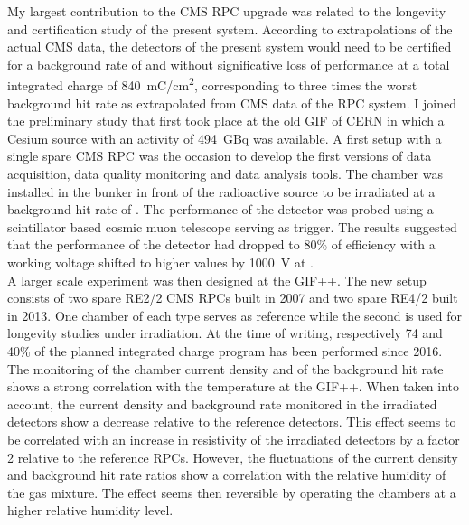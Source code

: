 	My largest contribution to the CMS RPC upgrade was related to the longevity and certification study of the present system. According to extrapolations of the actual CMS data, the detectors of the present system would need to be certified for a background rate of  and without significative loss of performance at a total integrated charge of \SI{840}{mC/cm^2}, corresponding to three times the worst background hit rate as extrapolated from CMS data of the RPC system. I joined the preliminary study that first took place at the old \acl{GIF} of CERN in which a Cesium source with an activity of \SI{494}{GBq} was available. A first setup with a single spare CMS RPC was the occasion to develop the first versions of data acquisition, data quality monitoring and data analysis tools. The chamber was installed in the bunker in front of the radioactive source to be irradiated at a background hit rate of . The performance of the detector was probed using a scintillator based cosmic muon telescope serving as trigger. The results suggested that the performance of the detector had dropped to 80\% of efficiency with a working voltage shifted to higher values by \SI{1000}{V} at .\\
	A larger scale experiment was then designed at the GIF++. The new setup consists of two spare RE2/2 CMS RPCs built in 2007 and two spare RE4/2 built in 2013. One chamber of each type serves as reference while the second is used for longevity studies under irradiation. At the time of writing, respectively 74 and 40\% of the planned integrated charge program has been performed since 2016. The monitoring of the chamber current density and of the background hit rate shows a strong correlation with the temperature at the GIF++. When taken into account, the current density and background rate monitored in the irradiated detectors show a decrease relative to the reference detectors. This effect seems to be correlated with an increase in resistivity of the irradiated detectors by a factor 2 relative to the reference RPCs. However, the fluctuations of the current density and background hit rate ratios show a correlation with the relative humidity of the gas mixture. The effect seems then reversible by operating the chambers at a higher relative humidity level.\\

